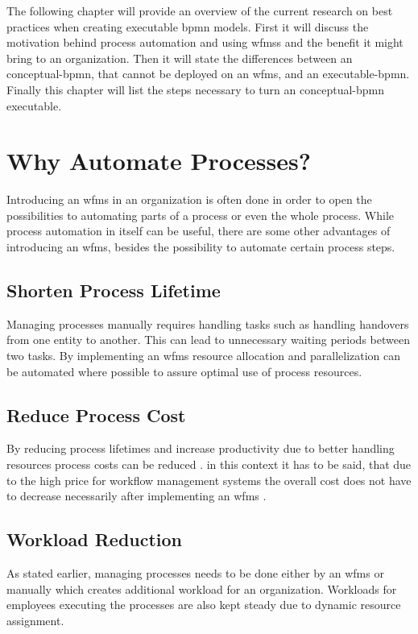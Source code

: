\label{chapter-2}
The following chapter will provide an overview of the current research on best practices when creating executable \gls{bpmn} models. First it will discuss the motivation behind process automation and using \gls{wfms}s and the benefit it might bring to an organization. Then it will state the differences between an \gls{conceptual-bpmn}, that cannot be deployed on an \gls{wfms}, and an \gls{executable-bpmn}. Finally this chapter will list the steps necessary to turn an \gls{conceptual-bpmn} executable.

\section{Why Automate Processes?}
Introducing an \gls{wfms} in an organization is often done in order to open the possibilities to automating parts of a process or even the whole process. While process automation in itself can be useful, there are some other advantages of introducing an \gls{wfms}, besides the possibility to automate certain process steps.

\subsection{Shorten Process Lifetime}
Managing processes manually requires handling tasks such as handling handovers from one entity to another. This can lead to unnecessary waiting periods between two tasks. By implementing an \gls{wfms} resource allocation and parallelization can be automated where possible to assure optimal use of process resources. \cite{gadatsch2020grundkurs}

\subsection{Reduce Process Cost}
By reducing process lifetimes and increase productivity due to better handling resources process costs can be reduced \cite{gadatsch2020grundkurs}. in this context it has to be said, that due to the high price for workflow management systems the overall cost does not have to decrease necessarily after implementing an \gls{wfms} \cite{gruber2009profitability}.

\subsection{Workload Reduction}
As stated earlier, managing processes needs to be done either by an \gls{wfms} or manually which creates additional workload for an organization. Workloads for employees executing the processes are also kept steady due to dynamic resource assignment. \cite{fundamentals}\cite{gadatsch2020grundkurs}


